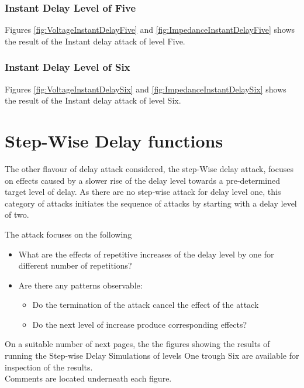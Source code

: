 \subsubsection{Instant Delay Level of Five}
Figures \ref{fig:VoltageInstantDelayFive} and \ref{fig:ImpedanceInstantDelayFive} shows the result of the Instant delay attack of level Five. 

\subsubsection{Instant Delay Level of Six}
Figures \ref{fig:VoltageInstantDelaySix} and \ref{fig:ImpedanceInstantDelaySix} shows the result of the Instant delay attack of level Six. 








\newpage
\section{Step-Wise Delay functions}
The other flavour of delay attack considered, the step-Wise delay attack, focuses on effects caused by a slower rise of the delay level towards a pre-determined target level of delay. As there are no step-wise attack for delay level one, this category of attacks initiates the sequence of attacks by starting with a delay level of two.

The attack focuses on the following 
\begin{itemize}
\item What are the effects of repetitive increases of the delay level by one for different number of repetitions?
\item Are there any patterns observable:
\begin{itemize}
    \item Do the termination of the attack cancel the effect of the attack
    \item Do the next level of increase produce corresponding effects? 
\end{itemize}

\end{itemize}



On a suitable number of next pages, the the figures showing the results of running the Step-wise Delay Simulations of levels One trough Six are available for inspection of the results. \\ 
Comments are located underneath each figure.


















